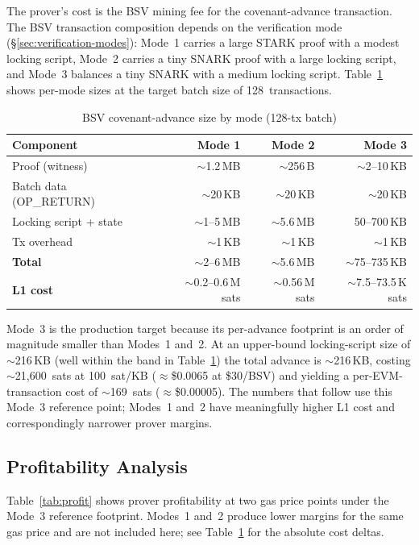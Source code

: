 \documentclass[11pt,twocolumn]{article}
\begin{document}
The prover's cost is the BSV mining fee for the covenant-advance transaction. The BSV transaction composition depends on the verification mode (\S\ref{sec:verification-modes}): Mode~1 carries a large STARK proof with a modest locking script, Mode~2 carries a tiny SNARK proof with a large locking script, and Mode~3 balances a tiny SNARK with a medium locking script. Table~\ref{tab:costs} shows per-mode sizes at the target batch size of 128~transactions.

\begin{table}[h]
\centering
\caption{BSV covenant-advance size by mode (128-tx batch)}
\label{tab:costs}
\small
\begin{tabular}{@{}lrrr@{}}
\toprule
\textbf{Component} & \textbf{Mode 1} & \textbf{Mode 2} & \textbf{Mode 3} \\
\midrule
Proof (witness)          & $\sim$1.2\,MB   & $\sim$256\,B    & $\sim$2--10\,KB \\
Batch data (OP\_RETURN)  & $\sim$20\,KB    & $\sim$20\,KB    & $\sim$20\,KB \\
Locking script + state   & $\sim$1--5\,MB  & $\sim$5.6\,MB   & 50--700\,KB \\
Tx overhead              & $\sim$1\,KB     & $\sim$1\,KB     & $\sim$1\,KB \\
\midrule
\textbf{Total}           & $\sim$2--6\,MB  & $\sim$5.6\,MB   & $\sim$75--735\,KB \\
\textbf{L1 cost}         & $\sim$0.2--0.6\,M sats & $\sim$0.56\,M sats & $\sim$7.5--73.5\,K sats \\
\bottomrule
\end{tabular}
\end{table}

Mode~3 is the production target because its per-advance footprint is an order of magnitude smaller than Modes~1 and~2. At an upper-bound locking-script size of $\sim$216\,KB (well within the band in Table~\ref{tab:costs}) the total advance is $\sim$216\,KB, costing $\sim$21,600~sats at 100~sat/KB ($\approx$\$0.0065 at \$30/BSV) and yielding a per-EVM-transaction cost of $\sim$169~sats ($\approx$\$0.00005). The numbers that follow use this Mode~3 reference point; Modes~1 and~2 have meaningfully higher L1 cost and correspondingly narrower prover margins.

\subsection{Profitability Analysis}

Table~\ref{tab:profit} shows prover profitability at two gas price points under the Mode~3 reference footprint. Modes~1 and~2 produce lower margins for the same gas price and are not included here; see Table~\ref{tab:costs} for the absolute cost deltas.
\end{document}
